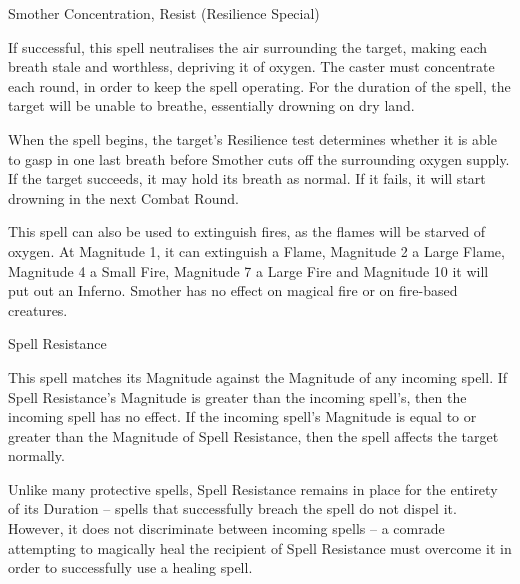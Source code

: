 \begin{rpg-spell}
{Smother}
{Concentration, Resist (Resilience Special)}

If successful, this spell neutralises the air surrounding the target, making each breath stale and worthless, depriving it of oxygen. The caster must concentrate each round, in order to keep the spell operating. For the duration of the spell, the target will be unable to breathe, essentially drowning on dry land. 

When the spell begins, the target’s Resilience test determines whether it is able to gasp in one last breath before Smother cuts off the surrounding oxygen supply. If the target succeeds, it may hold its breath as normal. If it fails, it will start drowning in the next Combat Round. 

This spell can also be used to extinguish fires, as the flames will be starved of oxygen. At Magnitude 1, it can extinguish a Flame, Magnitude 2 a Large Flame, Magnitude 4 a Small Fire, Magnitude 7 a Large Fire and Magnitude 10 it will put out an Inferno. Smother has no effect on magical fire or on fire-based creatures. 
\end{rpg-spell}


\begin{rpg-spell}
{Spell Resistance}
{}

This spell matches its Magnitude against the Magnitude of any incoming spell. If Spell Resistance’s Magnitude is greater than the incoming spell’s, then the incoming spell has no effect. If the incoming spell’s Magnitude is equal to or greater than the Magnitude of Spell Resistance, then the spell affects the target normally. 

Unlike many protective spells, Spell Resistance remains in place for the entirety of its Duration – spells that successfully breach the spell do not dispel it. However, it does not discriminate between incoming spells – a comrade attempting to magically heal the recipient of Spell Resistance must overcome it in order to successfully use a healing spell. 
\end{rpg-spell}


